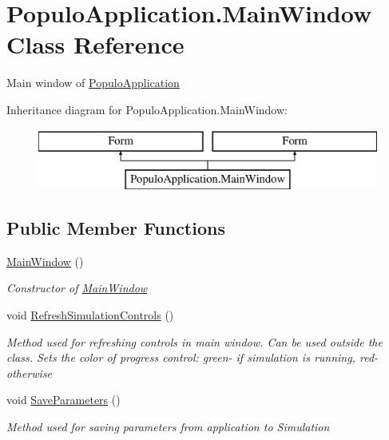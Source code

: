 \hypertarget{class_populo_application_1_1_main_window}{\section{Populo\+Application.\+Main\+Window Class Reference}
\label{class_populo_application_1_1_main_window}
}


Main window of \hyperlink{namespace_populo_application}{Populo\+Application}  


Inheritance diagram for Populo\+Application.\+Main\+Window\+:\begin{figure}[H]
\begin{center}
\leavevmode
\includegraphics[height=2.000000cm]{class_populo_application_1_1_main_window}
\end{center}
\end{figure}
\subsection*{Public Member Functions}
\begin{DoxyCompactItemize}
\item 
\hyperlink{class_populo_application_1_1_main_window_a2d0281fd0fad2e4077e839e06386bf27}{Main\+Window} ()
\begin{DoxyCompactList}\small\item\em Constructor of \hyperlink{class_populo_application_1_1_main_window}{Main\+Window} \end{DoxyCompactList}\item 
void \hyperlink{class_populo_application_1_1_main_window_a51aeb83f39fcbff00c395c49bd318fdf}{Refresh\+Simulation\+Controls} ()
\begin{DoxyCompactList}\small\item\em Method used for refreshing controls in main window. Can be used outside the class. Sets the color of progress control\+: green-\/ if simulation is running, red-\/ otherwise \end{DoxyCompactList}\item 
void \hyperlink{class_populo_application_1_1_main_window_a080f38423250539baf475a7cc6124e68}{Save\+Parameters} ()
\begin{DoxyCompactList}\small\item\em Method used for saving parameters from application to Simulation \end{DoxyCompactList}\end{DoxyCompactItemize}

